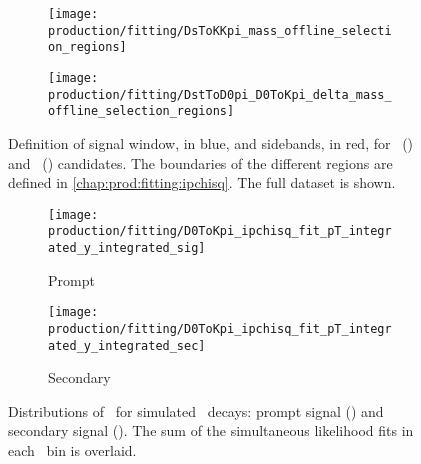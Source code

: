 \begin{figure}
  \begin{subfigure}{0.5\textwidth}
    \texttt{[image: production/fitting/DsToKKpi\_mass\_offline\_selection\_regions]}
    \caption{\DspTophipi}
    \label{fig:prod:fitting:regions:DsTophipi}
  \end{subfigure}
  \begin{subfigure}{0.5\textwidth}
    \texttt{[image: production/fitting/DstToD0pi\_D0ToKpi\_delta\_mass\_offline\_selection\_regions]}
    \caption{\DstToDzpi}
    \label{fig:prod:fitting:regions:DstToD0pi_D0ToKpi}
  \end{subfigure}
  \caption{%
    Definition of signal window, in blue, and sidebands, in red, for 
    \DspTophipi~() and 
    \DstToDzpi~() 
    candidates.
    The boundaries of the different regions are defined in 
    \cref{chap:prod:fitting:ipchisq}.
    The full dataset is shown.
  }
  \label{fig:prod:fitting:regions_B}
\end{figure}

\begin{figure}
  \begin{subfigure}[b]{0.5\textwidth}
    \centering
    \texttt{[image: production/fitting/D0ToKpi\_ipchisq\_fit\_pT\_integrated\_y\_integrated\_sig]}
    \caption{Prompt}
    \label{fig:prod:fitting:prefits:D0ToKpi:prompt}
  \end{subfigure}
  \begin{subfigure}[b]{0.5\textwidth}
    \centering
    \texttt{[image: production/fitting/D0ToKpi\_ipchisq\_fit\_pT\_integrated\_y\_integrated\_sec]}
    \caption{Secondary}
    \label{fig:prod:fitting:prefits:D0ToKpi:secondary}
  \end{subfigure}
  \caption{%
    Distributions of \lnipchisq\ for simulated \DzToKpi\ decays: prompt signal 
    \PDzero () and secondary 
    signal \PDzero ().
    The sum of the simultaneous likelihood fits in each \pTy\ bin is overlaid.
  }
  \label{fig:prod:fitting:prefits:D0ToKpi}
\end{figure}

